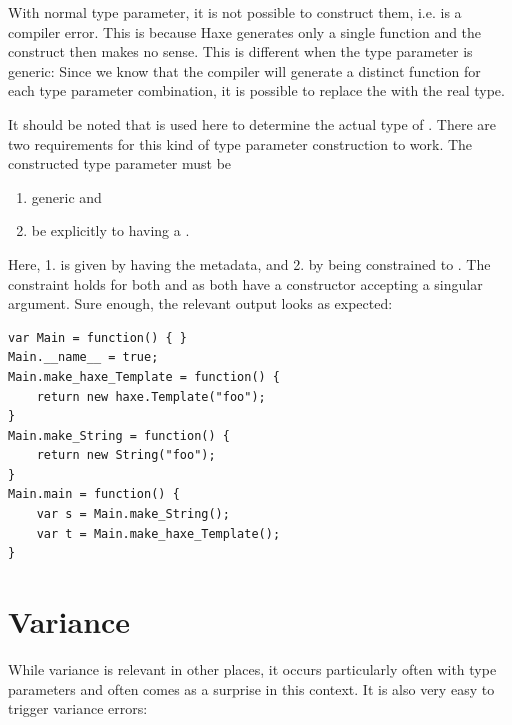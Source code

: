 \documentclass{haxe}
\begin{document}

With normal type parameter, it is not possible to construct them, i.e.  is a compiler error. This is because Haxe generates only a single function and the construct then makes no sense. This is different when the type parameter is generic: Since we know that the compiler will generate a distinct function for each type parameter combination, it is possible to replace the   with the real type.


It should be noted that  is used here to determine the actual type of . There are two requirements for this kind of type parameter construction to work. The constructed type parameter must be

\begin{enumerate}
	\item generic and
	\item be explicitly  to having a .
\end{enumerate}

Here, 1. is given by  having the  metadata, and 2. by  being constrained to . The constraint holds for both  and  as both have a constructor accepting a singular  argument. Sure enough, the relevant  output looks as expected:

\begin{lstlisting}
var Main = function() { }
Main.__name__ = true;
Main.make_haxe_Template = function() {
	return new haxe.Template("foo");
}
Main.make_String = function() {
	return new String("foo");
}
Main.main = function() {
	var s = Main.make_String();
	var t = Main.make_haxe_Template();
}
\end{lstlisting}

\section{Variance}
\label{type-system-variance}

While variance is relevant in other places, it occurs particularly often with type parameters and often comes as a surprise in this context. It is also very easy to trigger variance errors:
\end{document}

